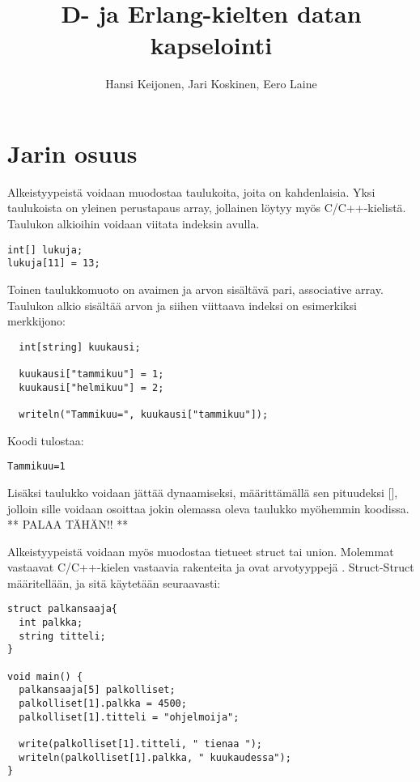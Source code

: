 \documentclass[11pt,oneside,a4paper]{article}
\title{D- ja Erlang-kielten datan kapselointi}
\author{Hansi Keijonen, Jari Koskinen, Eero Laine}
\begin{document}
\maketitle

\newpage

\section{Jarin osuus}

Alkeistyypeistä voidaan muodostaa taulukoita, joita on kahdenlaisia. Yksi taulukoista on yleinen perustapaus array, jollainen löytyy myös C/C++-kielistä. Taulukon alkioihin voidaan viitata indeksin avulla.
\begin{verbatim}
int[] lukuja;
lukuja[11] = 13;
\end{verbatim}

Toinen taulukkomuoto on avaimen ja arvon sisältävä pari, associative array. Taulukon alkio sisältää arvon ja siihen viittaava indeksi on esimerkiksi merkkijono: 
\begin{verbatim}
  int[string] kuukausi;
  
  kuukausi["tammikuu"] = 1;
  kuukausi["helmikuu"] = 2;
  
  writeln("Tammikuu=", kuukausi["tammikuu"]);
\end{verbatim}
Koodi tulostaa:
\begin{verbatim}
Tammikuu=1
\end{verbatim}

Lisäksi taulukko voidaan jättää dynaamiseksi, määrittämällä sen pituudeksi [], jolloin sille voidaan osoittaa jokin olemassa oleva taulukko myöhemmin koodissa. ** PALAA TÄHÄN!! **

Alkeistyypeistä voidaan myös muodostaa tietueet struct tai union. Molemmat vastaavat C/C++-kielen vastaavia rakenteita ja ovat arvotyyppejä \cite{DLA13}. Struct-Struct määritellään, ja sitä käytetään seuraavasti:

\begin{verbatim}
struct palkansaaja{
  int palkka;
  string titteli;
}

void main() {
  palkansaaja[5] palkolliset;
  palkolliset[1].palkka = 4500;
  palkolliset[1].titteli = "ohjelmoija";

  write(palkolliset[1].titteli, " tienaa ");
  writeln(palkolliset[1].palkka, " kuukaudessa");
}
\end{verbatim}
\end{document}
